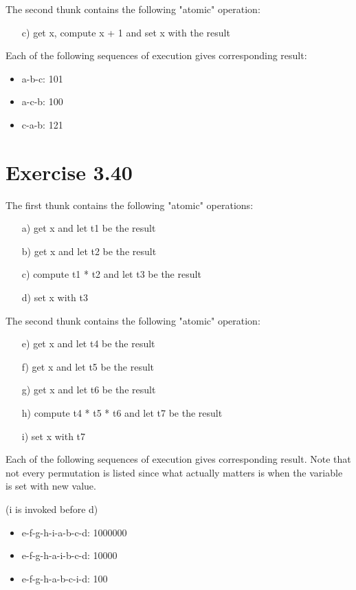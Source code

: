 \documentclass[../main.tex]{subfiles}
\begin{document}
The second thunk contains the following "atomic"
operation:

\begin{itemize}
\item[c)] get x, compute x + 1 and set x with the result
\end{itemize}

Each of the following sequences of execution gives corresponding result:

\begin{itemize}
\item a-b-c: 101
\item a-c-b: 100
\item c-a-b: 121
\end{itemize}

\section{Exercise 3.40}

The first thunk contains the following "atomic" operations:

\begin{itemize}
\item[a)] get x and let t1 be the result
\item[b)] get x and let t2 be the result
\item[c)] compute t1 * t2 and let t3 be the result
\item[d)] set x with t3
\end{itemize}

The second thunk contains the following "atomic"
operation:

\begin{itemize}
\item[e)] get x and let t4 be the result
\item[f)] get x and let t5 be the result
\item[g)] get x and let t6 be the result
\item[h)] compute t4 * t5 * t6 and let t7 be the result
\item[i)] set x with t7
\end{itemize}

Each of the following sequences of execution gives corresponding result. Note that not every permutation is listed since what actually matters is when the variable is set with new value.

(i is invoked before d)

\begin{itemize}
\item e-f-g-h-i-a-b-c-d: 1000000
\item e-f-g-h-a-i-b-c-d: 10000
\item e-f-g-h-a-b-c-i-d: 100
\end{itemize}
\end{document}
